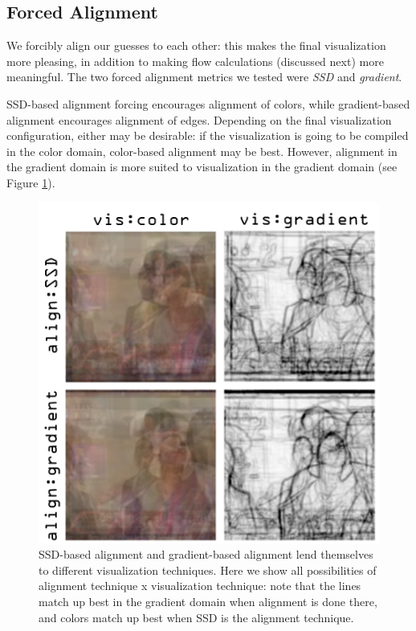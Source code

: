 \subsection{Forced Alignment}
We forcibly align our guesses to each other: this makes the final visualization more pleasing, in addition to making flow calculations (discussed next) more meaningful.  The two forced alignment metrics we tested were \emph{SSD} and \emph{gradient}.

SSD-based alignment forcing encourages alignment of colors, while gradient-based alignment encourages alignment of edges.  Depending on the final visualization configuration, either may be desirable: if the visualization is going to be compiled in the color domain, color-based alignment may be best.  However, alignment in the gradient domain is more suited to visualization in the gradient domain (see Figure \ref{fig:align}).

\begin{figure}
\centering
    \includegraphics[width=1.0\columnwidth]{figures/align.png}
\caption{SSD-based alignment and gradient-based alignment lend themselves to different visualization techniques.  Here we show all possibilities of alignment technique x visualization technique: note that the lines match up best in the gradient domain when alignment is done there, and colors match up best when SSD is the alignment technique.}
\label{fig:align}
\end{figure}

